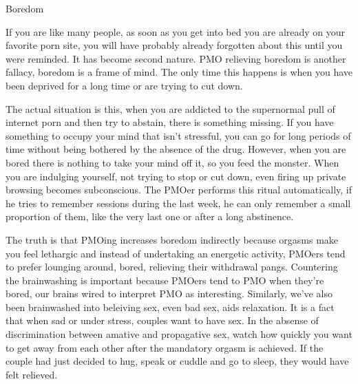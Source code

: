 Boredom

If you are like many people, as soon as you get into bed you are already on your favorite porn site, you will have probably already forgotten about this until you were reminded. It has become second nature. PMO relieving boredom is another fallacy, boredom is a frame of mind. The only time this happens is when you have been deprived for a long time or are trying to cut down.

The actual situation is this, when you are addicted to the supernormal pull of internet porn and then try to abstain, there is something missing. If you have something to occupy your mind that isn't stressful, you can go for long periods of time without being bothered by the absence of the drug. However, when you are bored there is nothing to take your mind off it, so you feed the monster. When you are indulging yourself, not trying to stop or cut down, even firing up private browsing becomes subconscious. The PMOer performs this ritual automatically, if he tries to remember sessions during the last week, he can only remember a small proportion of them, like the very last one or after a long abstinence.

The truth is that PMOing increases boredom indirectly because orgasms make you feel lethargic and instead of undertaking an energetic activity, PMOers tend to prefer lounging around, bored, relieving their withdrawal pangs. Countering the brainwashing is important because PMOers tend to PMO when they're bored, our brains wired to interpret PMO as interesting. Similarly, we've also been brainwashed into beleiving sex, even bad sex, aids relaxation. It is a fact that when sad or under stress, couples want to have sex. In the absense of discrimination between amative and propagative sex, watch how quickly you want to get away from each other after the mandatory orgasm is achieved. If the couple had just decided to hug, speak or cuddle and go to sleep, they would have felt relieved.
